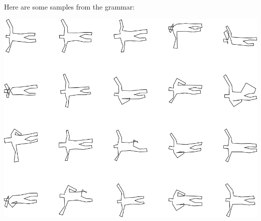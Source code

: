 Here are some samples from the grammar:

\includegraphics[width=6in]{output/3.learning/incremental/gram.20.d/samples.png}

